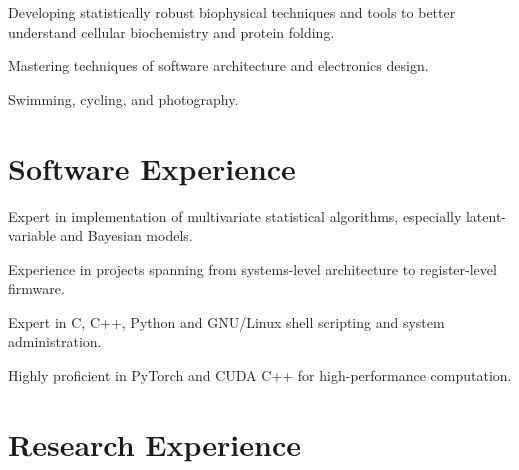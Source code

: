 \documentclass[letterpaper]{article}
\renewenvironment{itemize}{
  \begin{list}{}{
    \setlength{\leftmargin}{1.5em}
  }
}{
  \end{list}
}
\begin{document}
\begin{itemize}
\item{
  Developing statistically robust biophysical techniques and tools to better
  understand cellular biochemistry and protein folding.
}
\item{
  Mastering techniques of software architecture and electronics design.
}
\item{
  Swimming, cycling, and photography.
}
\end{itemize}


\section*{Software Experience}

\begin{itemize}
\item{
  Expert in implementation of multivariate statistical algorithms,
  especially latent-variable and Bayesian models.
}
\item{
  Experience in projects spanning from systems-level architecture to
  register-level firmware.
}
\item{
  Expert in C, C++, Python and GNU/Linux shell scripting and
  system administration.
}
\item{
  Highly proficient in PyTorch and CUDA C++ for high-performance
  computation.
}
\end{itemize}


\section*{Research Experience}
\end{document}
